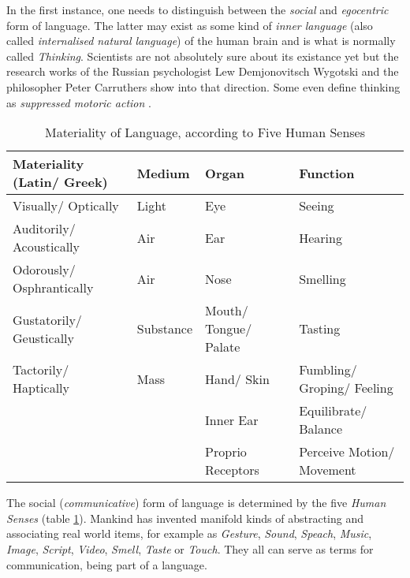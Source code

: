 In the first instance, one needs to distinguish between the \emph{social} and
\emph{egocentric} form of language. The latter may exist as some kind of
\emph{inner language} (also called \emph{internalised natural language}) of the
human brain and is what is normally called \emph{Thinking}. Scientists are not
absolutely sure about its existance yet but the research works of the Russian
psychologist Lew Demjonovitsch Wygotski and the philosopher Peter Carruthers
\cite{jaeger} show into that direction. Some even define thinking as
\textit{suppressed motoric action} \cite[p. 41-42]{jaeger}.

\begin{table}[ht]
    \begin{center}
        \begin{footnotesize}
        \begin{tabular}{| p{40mm} | p{15mm} | p{25mm} | p{25mm} |}
            \hline
            \textbf{Materiality (Latin/ Greek)} & \textbf{Medium} & \textbf{Organ} & \textbf{Function}\\
            \hline
            Visually/ Optically & Light & Eye & Seeing\\
            \hline
            Auditorily/ Acoustically & Air & Ear & Hearing\\
            \hline
            Odorously/ Osphrantically & Air & Nose & Smelling\\
            \hline
            Gustatorily/ Geustically & Substance & Mouth/ Tongue/ Palate & Tasting\\
            \hline
            Tactorily/ Haptically & Mass & Hand/ Skin & Fumbling/ Groping/ Feeling\\
            \hline
            & & Inner Ear & Equilibrate/ Balance\\
            \hline
            & & Proprio Receptors & Perceive Motion/ Movement\\
            \hline
        \end{tabular}
        \end{footnotesize}
        \caption{Materiality of Language, according to Five Human Senses \cite{buesch}}
        \label{senses_table}
    \end{center}
\end{table}

The social (\emph{communicative}) form of language is determined by the five
\emph{Human Senses} (table \ref{senses_table}). Mankind has invented manifold
kinds of abstracting and associating real world items, for example as
\emph{Gesture}, \emph{Sound}, \emph{Speach}, \emph{Music}, \emph{Image},
\emph{Script}, \emph{Video}, \emph{Smell}, \emph{Taste} or \emph{Touch}.
They all can serve as terms for communication, being part of a language.

